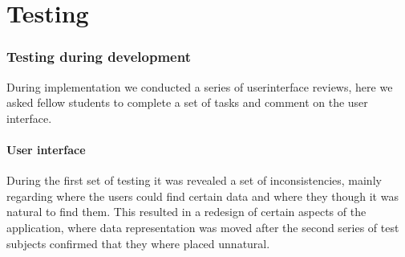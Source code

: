 \chapter{Testing}
\subsection{Testing during development}
During implementation we conducted a series of userinterface reviews, here we asked fellow students to complete a set of tasks and comment on the user interface. 
\subsubsection{User interface}
During the first set of testing it was revealed a set of inconsistencies, mainly regarding where the users could find certain data and where they though it was natural to find them. 
This resulted in a redesign of certain aspects of the application, where data representation was moved after the second series of test subjects confirmed that they where placed unnatural.